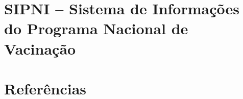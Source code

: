 \documentclass[
  letterpaper,
  DIV=11,
  numbers=noendperiod]{scrreprt}
\begin{document}

\chapter{SIPNI -- Sistema de Informações do Programa Nacional de
Vacinação}\label{sipni-sistema-de-informauxe7uxf5es-do-programa-nacional-de-vacinauxe7uxe3o}


\chapter*{Referências}\label{referuxeancias}


\label{refs}
\end{document}
